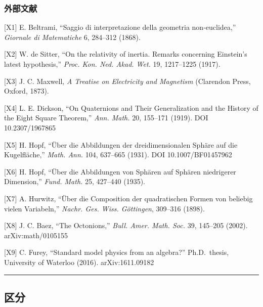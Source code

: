 \documentclass[
  a4paper,
]{ltjsarticle}
\begin{document}
\subsubsection{外部文献}\label{ux5916ux90e8ux6587ux732e}

{[}X1{]} E. Beltrami, ``Saggio di interpretazione della geometria
non-euclidea,'' \emph{Giornale di Matematiche} 6, 284--312 (1868).

{[}X2{]} W. de Sitter, ``On the relativity of inertia. Remarks
concerning Einstein's latest hypothesis,'' \emph{Proc. Kon. Ned. Akad.
Wet.} 19, 1217--1225 (1917).

{[}X3{]} J. C. Maxwell, \emph{A Treatise on Electricity and Magnetism}
(Clarendon Press, Oxford, 1873).

{[}X4{]} L. E. Dickson, ``On Quaternions and Their Generalization and
the History of the Eight Square Theorem,'' \emph{Ann. Math.} 20,
155--171 (1919). DOI 10.2307/1967865

{[}X5{]} H. Hopf, ``Über die Abbildungen der dreidimensionalen Sphäre
auf die Kugelfläche,'' \emph{Math. Ann.} 104, 637--665 (1931). DOI
10.1007/BF01457962

{[}X6{]} H. Hopf, ``Über die Abbildungen von Sphären auf Sphären
niedrigerer Dimension,'' \emph{Fund. Math.} 25, 427--440 (1935).

{[}X7{]} A. Hurwitz, ``Über die Composition der quadratischen Formen von
beliebig vielen Variabeln,'' \emph{Nachr. Ges. Wiss. Göttingen},
309--316 (1898).

{[}X8{]} J. C. Baez, ``The Octonions,'' \emph{Bull. Amer. Math. Soc.}
39, 145--205 (2002). arXiv:math/0105155

{[}X9{]} C. Furey, ``Standard model physics from an algebra?''
Ph.D.~thesis, University of Waterloo (2016). arXiv:1611.09182

\begin{center}\rule{0.5\linewidth}{0.5pt}\end{center}

\subsection{区分}\label{ux533aux5206}
\end{document}
